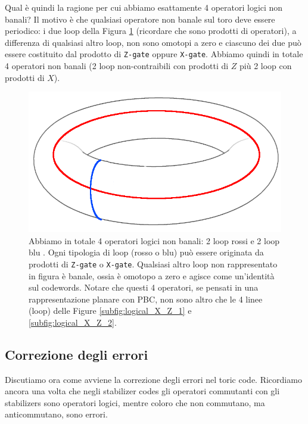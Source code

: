 \noindent Qual è quindi la ragione per cui abbiamo esattamente 4 operatori logici non banali? Il motivo è che qualsiasi operatore non banale sul toro deve essere periodico: i due loop della Figura \ref{fig:torus} (ricordare che sono prodotti di operatori), a differenza di qualsiasi altro loop, non sono omotopi a zero e ciascuno dei due può essere costituito dal prodotto di \texttt{Z-gate} oppure \texttt{X-gate}. Abbiamo quindi in totale 4 operatori non banali (2 loop non-contraibili con prodotti di $Z$ più 2 loop con prodotti di $X$). 

\begin{figure}[!h]
    \centering
    \includegraphics[scale=0.33]{images/torus}
    \caption{Abbiamo in totale 4 operatori logici non banali: 2 loop rossi e 2 loop blu . Ogni tipologia di loop (rosso o blu) può essere originata da prodotti di \texttt{Z-gate} o \texttt{X-gate}. Qualsiasi altro loop non rappresentato in figura è banale, ossia è omotopo a zero e agisce come un'identità sul codewords. Notare che questi 4 operatori, se pensati in una rappresentazione planare con PBC, non sono altro che le 4 linee (loop) delle Figure \ref{subfig:logical_X_Z_1} e \ref{subfig:logical_X_Z_2}.}
    \label{fig:torus}
\end{figure}

\subsection{Correzione degli errori}
Discutiamo ora come avviene la correzione degli errori nel toric code. Ricordiamo ancora una volta che negli stabilizer codes gli operatori commutanti con gli stabilizers sono operatori logici, mentre coloro che non commutano, ma anticommutano, sono errori.

